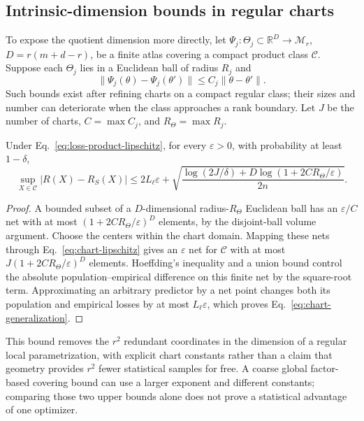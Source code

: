 \subsection{Intrinsic-dimension bounds in regular charts}
To expose the quotient dimension more directly, let
$\Psi_j:\Theta_j\subset\mathbb R^{D}\to\mathcal M_r$,
$D=r(m+d-r)$, be a finite atlas covering a compact product class
$\mathcal C$. Suppose each $\Theta_j$ lies in a Euclidean ball of radius
$R_j$ and
\begin{equation}
 \|\Psi_j(\theta)-\Psi_j(\theta')\|\leq C_j\|\theta-\theta'\|.
 \label{eq:chart-lipschitz}
\end{equation}
Such bounds exist after refining charts on a compact regular class;
their sizes and number can deteriorate when the class approaches a rank
boundary. Let $J$ be the number of charts, $C=\max C_j$, and
$R_\Theta=\max R_j$.

\begin{theorem}
\label{thm:chart-generalization}
Under Eq.~\eqref{eq:loss-product-lipschitz}, for every $\varepsilon>0$,
with probability at least $1-\delta$,
\begin{equation}
 \sup_{X\in\mathcal C}|R(X)-R_S(X)|
 \leq2L_\ell\varepsilon+
 \sqrt{\frac{\log(2J/\delta)+
 D\log(1+2CR_\Theta/\varepsilon)}{2n}}.
 \label{eq:chart-generalization}
\end{equation}
\end{theorem}
\begin{proof}
A bounded subset of a $D$-dimensional radius-$R_\Theta$ Euclidean ball
has an $\varepsilon/C$ net with at most
$(1+2CR_\Theta/\varepsilon)^D$ elements, by the disjoint-ball volume
argument. Choose the centers within the chart domain. Mapping these nets
through Eq.~\eqref{eq:chart-lipschitz} gives an $\varepsilon$ net for
$\mathcal C$ with at most $J(1+2CR_\Theta/\varepsilon)^D$ elements.
Hoeffding's inequality and a union bound control the absolute
population--empirical difference on this finite net by the square-root
term. Approximating an arbitrary predictor by a net point changes both
its population and empirical losses by at most $L_\ell\varepsilon$,
which proves Eq.~\eqref{eq:chart-generalization}.
\end{proof}

This bound removes the $r^2$ redundant coordinates in the dimension of a
regular local parametrization, with explicit chart constants rather than
a claim that geometry provides $r^2$ fewer statistical samples for free.
A coarse global factor-based covering bound can use a larger exponent
and different constants; comparing those two upper bounds alone does not
prove a statistical advantage of one optimizer.

